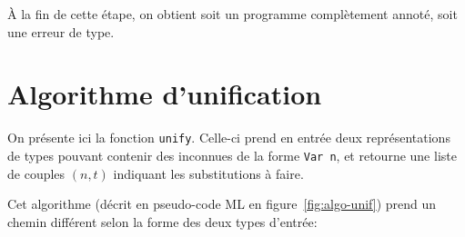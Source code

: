 À la fin de cette étape, on obtient soit un programme complètement annoté, soit
une erreur de type.

\section{Algorithme d'unification}
\label{sec:unif}

On présente ici la fonction \texttt{unify}. Celle-ci prend en entrée deux
représentations de types pouvant contenir des inconnues de la forme \texttt{Var
n}, et retourne une liste de couples $(n, t)$ indiquant les substitutions à
faire.

Cet algorithme (décrit en pseudo-code ML en figure~\ref{fig:algo-unif}) prend un
chemin différent selon la forme des deux types d'entrée:


